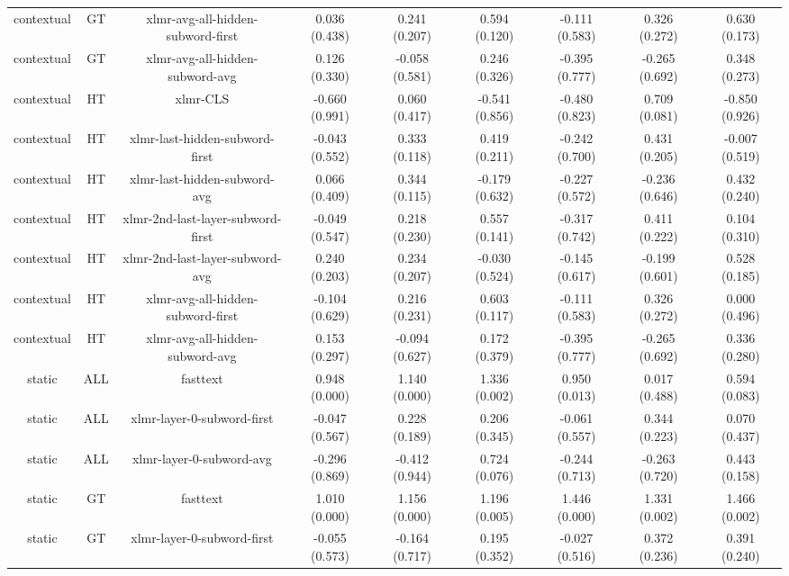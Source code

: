 \begin{sidewaystable}[htb]
\begin{tabular}{@{}ccccccccc@{}}
        contextual & GT & xlmr-avg-all-hidden-subword-first & 0.036 (0.438) & 0.241 (0.207) & 0.594 (0.120) & -0.111 (0.583) & 0.326 (0.272) & 0.630 (0.173) \\
        contextual & GT & xlmr-avg-all-hidden-subword-avg & 0.126 (0.330) & -0.058 (0.581) & 0.246 (0.326) & -0.395 (0.777) & -0.265 (0.692) & 0.348 (0.273) \\
        contextual & HT & xlmr-CLS & -0.660 (0.991) & 0.060 (0.417) & -0.541 (0.856) & -0.480 (0.823) & 0.709 (0.081) & -0.850 (0.926) \\
        contextual & HT & xlmr-last-hidden-subword-first & -0.043 (0.552) & 0.333 (0.118) & 0.419 (0.211) & -0.242 (0.700) & 0.431 (0.205) & -0.007 (0.519) \\
        contextual & HT & xlmr-last-hidden-subword-avg & 0.066 (0.409) & 0.344 (0.115) & -0.179 (0.632) & -0.227 (0.572) & -0.236 (0.646) & 0.432 (0.240) \\
        contextual & HT & xlmr-2nd-last-layer-subword-first & -0.049 (0.547) & 0.218 (0.230) & 0.557 (0.141) & -0.317 (0.742) & 0.411 (0.222) & 0.104 (0.310) \\
        contextual & HT & xlmr-2nd-last-layer-subword-avg & 0.240 (0.203) & 0.234 (0.207) & -0.030 (0.524) & -0.145 (0.617) & -0.199 (0.601) & 0.528 (0.185) \\
        contextual & HT & xlmr-avg-all-hidden-subword-first & -0.104 (0.629) & 0.216 (0.231) & 0.603 (0.117) & -0.111 (0.583) & 0.326 (0.272) & 0.000 (0.496) \\
        contextual & HT & xlmr-avg-all-hidden-subword-avg & 0.153 (0.297) & -0.094 (0.627) & 0.172 (0.379) & -0.395 (0.777) & -0.265 (0.692) & 0.336 (0.280) \\
        static & ALL & fasttext & 0.948 (0.000) & 1.140 (0.000) & 1.336 (0.002) & 0.950 (0.013) & 0.017 (0.488) & 0.594 (0.083) \\
        static & ALL & xlmr-layer-0-subword-first & -0.047 (0.567) & 0.228 (0.189) & 0.206 (0.345) & -0.061 (0.557) & 0.344 (0.223) & 0.070 (0.437) \\
        static & ALL & xlmr-layer-0-subword-avg & -0.296 (0.869) & -0.412 (0.944) & 0.724 (0.076) & -0.244 (0.713) & -0.263 (0.720) & 0.443 (0.158) \\
        static & GT & fasttext & 1.010 (0.000) & 1.156 (0.000) & 1.196 (0.005) & 1.446 (0.000) & 1.331 (0.002) & 1.466 (0.002) \\
        static & GT & xlmr-layer-0-subword-first & -0.055 (0.573) & -0.164 (0.717) & 0.195 (0.352) & -0.027 (0.516) & 0.372 (0.236) & 0.391 (0.240) \\

\end{tabular}
\end{sidewaystable}
